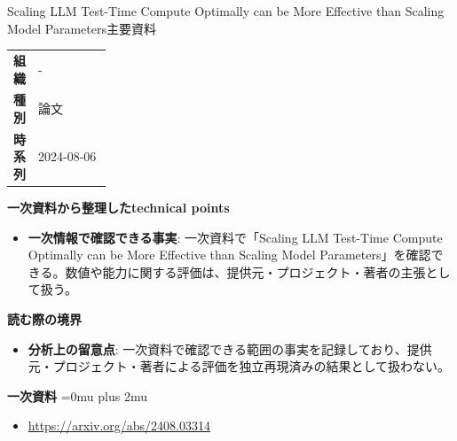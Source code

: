 \begin{technicalnote}{Scaling LLM Test-Time Compute Optimally can be More Effective than Scaling Model Parameters}{主要資料}
\begingroup
\begin{tabularx}{\linewidth}{@{}>{\bfseries}p{0.22\linewidth}X@{}}
組織 & - \\
種別 & 論文 \\
時系列 & 2024-08-06 \\
\end{tabularx}
\smallskip
{\bfseries 一次資料から整理したtechnical points}
\begin{itemize}[leftmargin=1.5em,itemsep=0.35em]
\item \textbf{一次情報で確認できる事実}: 一次資料で「Scaling LLM Test-Time Compute Optimally can be More Effective than Scaling Model Parameters」を確認できる。数値や能力に関する評価は、提供元・プロジェクト・著者の主張として扱う。
\end{itemize}
\begin{minipage}{\linewidth}
{\bfseries 読む際の境界}
\begin{itemize}[leftmargin=1.5em,itemsep=0.35em]
\item \textbf{分析上の留意点}: 一次資料で確認できる範囲の事実を記録しており、提供元・プロジェクト・著者による評価を独立再現済みの結果として扱わない。
\end{itemize}
\begin{samepage}
{\bfseries 一次資料}
\begingroup\sloppy
\Urlmuskip=0mu plus 2mu\relax
\begin{itemize}[leftmargin=1.5em,itemsep=0.25em]
\item {\scriptsize\url{https://arxiv.org/abs/2408.03314}}
\end{itemize}
\endgroup
\end{samepage}
\end{minipage}
\endgroup
\end{technicalnote}
\medskip

